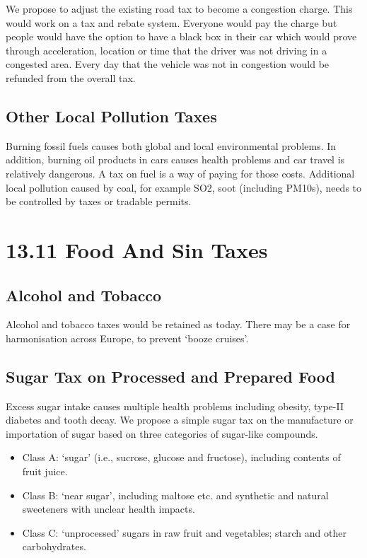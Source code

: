 \documentclass[]{tufte-handout}
\providecommand{\tightlist}{%
  \setlength{\itemsep}{0pt}\setlength{\parskip}{0pt}}
\begin{document}
We propose to adjust the existing road tax to become a congestion
charge. This would work on a tax and rebate system. Everyone would pay
the charge but people would have the option to have a black box in their
car which would prove through acceleration, location or time that the
driver was not driving in a congested area. Every day that the vehicle
was not in congestion would be refunded from the overall tax.

\hypertarget{other-local-pollution-taxes}{%
\subsection{Other Local Pollution
Taxes}\label{other-local-pollution-taxes}}

Burning fossil fuels causes both global and local environmental
problems. In addition, burning oil products in cars causes health
problems and car travel is relatively dangerous. A tax on fuel is a way
of paying for those costs. Additional local pollution caused by coal,
for example SO2, soot (including PM10s), needs to be controlled by taxes
or tradable permits.

\hypertarget{food-and-sin-taxes}{%
\section{13.11 Food And Sin Taxes}\label{food-and-sin-taxes}}

\hypertarget{alcohol-and-tobacco}{%
\subsection{Alcohol and Tobacco}\label{alcohol-and-tobacco}}

Alcohol and tobacco taxes would be retained as today. There may be a
case for harmonisation across Europe, to prevent `booze cruises'.

\hypertarget{sugar-tax-on-processed-and-prepared-food}{%
\subsection{Sugar Tax on Processed and Prepared
Food}\label{sugar-tax-on-processed-and-prepared-food}}

Excess sugar intake causes multiple health problems including obesity,
type-II diabetes and tooth decay. We propose a simple sugar tax on the
manufacture or importation of sugar based on three categories of
sugar-like compounds.

\begin{itemize}
\tightlist
\item
  Class A: `sugar' (i.e., sucrose, glucose and fructose), including
  contents of fruit juice.
\item
  Class B: `near sugar', including maltose etc. and synthetic and
  natural sweeteners with unclear health impacts.
\item
  Class C: `unprocessed' sugars in raw fruit and vegetables; starch and
  other carbohydrates.
\end{itemize}
\end{document}
